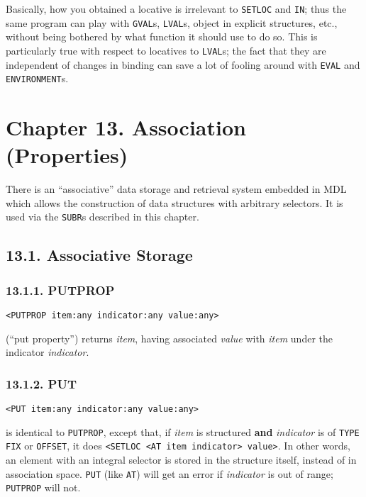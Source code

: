 \documentclass[a4paper,]{article}
\begin{document}
Basically, how you obtained a locative is irrelevant to \texttt{SETLOC}  and
\texttt{IN}; thus the same program can play with \texttt{GVAL}s, \texttt{LVAL}s, object in explicit
structures, etc., without being bothered by what function it should use to do so. This is particularly true with respect to
locatives to \texttt{LVAL}s; the fact that they are independent of changes in binding can save a lot of fooling around with
\texttt{EVAL} and \texttt{ENVIRONMENT}s.

\section{Chapter 13. Association (Properties)}\label{chapter-13.-association-properties}

There is an ``associative'' data storage and retrieval system embedded in MDL which allows the construction of data
structures with arbitrary selectors. It is used via the \texttt{SUBR}s described in this chapter.

\subsection{13.1. Associative Storage}\label{associative-storage}

\subsubsection{13.1.1. PUTPROP}\label{putprop}

\begin{verbatim}
<PUTPROP item:any indicator:any value:any>
\end{verbatim}

 (``put property'') returns \emph{item}, having associated \emph{value} with \emph{item}
under the indicator \emph{indicator}.

\subsubsection{13.1.2. PUT}\label{put}

\begin{verbatim}
<PUT item:any indicator:any value:any>
\end{verbatim}

 is identical to \texttt{PUTPROP}, except that, if \emph{item} is structured \textbf{and}
\emph{indicator} is of \texttt{TYPE} \texttt{FIX} or \texttt{OFFSET}, it does
\texttt{\textless{}SETLOC\ \textless{}AT\ item\ indicator\textgreater{}\ value\textgreater{}}. In other words, an element
with an integral selector is stored in the structure itself, instead of in association space. \texttt{PUT} (like
\texttt{AT}) will get an error if \emph{indicator} is out of range; \texttt{PUTPROP} will not.
\end{document}
